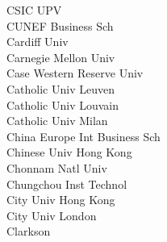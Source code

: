\documentclass[a4paper]{article}
\begin{document}
\begin{multicols*}{2}
\begin{footnotesize}
 CSIC UPV \\ CUNEF Business Sch \\ Cardiff Univ \\ Carnegie Mellon Univ \\ Case Western Reserve Univ \\ Catholic Univ Leuven \\ Catholic Univ Louvain \\ Catholic Univ Milan \\ China Europe Int Business Sch \\ Chinese Univ Hong Kong \\ Chonnam Natl Univ \\ Chungchou Inst Technol \\ City Univ Hong Kong \\ City Univ London \\ Clarkson
\end{footnotesize}
\end{multicols*}
\end{document}
